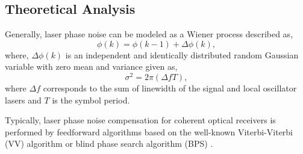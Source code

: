 \begin{refsection}
\subsection{Theoretical Analysis}
Generally, laser phase noise can be modeled as a Wiener process \cite{Ip07} described as,
\begin{equation}
    \phi(k) = \phi(k-1)+\Delta \phi(k),
    \label{eq_phaseNoise}
\end{equation}
where, $\Delta \phi(k)$ is an independent and identically distributed random Gaussian variable with zero mean and variance given as,
\begin{equation}
    	\sigma^{2} = 2\pi(\Delta f T),
    \label{eq_phaseNoise}
\end{equation}
where $\Delta f$ corresponds to the sum of linewidth of the signal and local oscillator lasers and $T$ is the symbol period.

Typically, laser phase noise compensation for coherent optical receivers is performed by feedforward algorithms based on the well-known Viterbi-Viterbi (VV) algorithm \cite{Viterbi83,Ip07} or blind phase search algorithm (BPS) \cite{Pfau09}.


\end{refsection}
